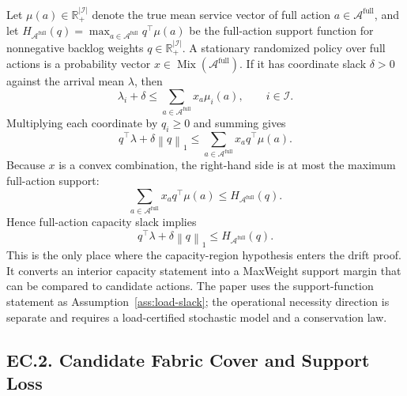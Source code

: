 \documentclass[opre,dblanonrev]{informs4}
\newcommand{\Afull}{\mathcal A^{\mathrm{full}}}
\newcommand{\Real}{\mathbb R}
\newcommand{\normone}[1]{\left\|#1\right\|_1}
\begin{document}
Let \(\mu(a)\in\Real_+^{|\mathcal I|}\) denote the true mean service vector of
full action \(a\in\Afull\), and let \(H_{\Afull}(q)=\max_{a\in\Afull}q^\top
\mu(a)\) be the full-action support function for nonnegative backlog weights
\(q\in\Real_+^{|\mathcal I|}\).  A stationary randomized policy over full
actions is a probability vector \(x\in\operatorname{Mix}(\Afull)\).  If it has coordinate
slack \(\delta>0\) against the arrival mean \(\lambda\), then
\begin{equation}
  \lambda_i+\delta \le \sum_{a\in\Afull}x_a \mu_i(a),
  \qquad i\in\mathcal I.
\end{equation}
Multiplying each coordinate by \(q_i\ge0\) and summing gives
\begin{equation}
  q^\top\lambda+\delta\normone{q}
  \le
  \sum_{a\in\Afull}x_a q^\top \mu(a).
\end{equation}
Because \(x\) is a convex combination, the right-hand side is at most the
maximum full-action support:
\begin{equation}
  \sum_{a\in\Afull}x_a q^\top \mu(a)
  \le
  H_{\Afull}(q).
\end{equation}
Hence full-action capacity slack implies
\begin{equation}
  \label{eq:ec-capacity-support}
  q^\top\lambda+\delta\normone{q}\le H_{\Afull}(q).
\end{equation}
This is the only place where the capacity-region hypothesis enters the drift
proof.  It converts an interior capacity statement into a MaxWeight support
margin that can be compared to candidate actions.  The paper uses the
support-function statement as Assumption~\ref{ass:load-slack}; the operational
necessity direction is separate and requires a load-certified stochastic model
and a conservation law.

\subsection*{EC.2. Candidate Fabric Cover and Support Loss}
\end{document}

